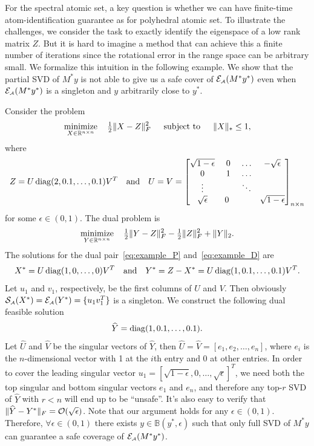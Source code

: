 For the spectral atomic set, a key question is whether we can have finite-time atom-identification guarantee as for polyhedral atomic set. To illustrate the challenges, we consider the task to exactly identify the eigenspace of a low rank matrix $Z$. But it is hard to imagine a method that can achieve this a finite number of iterations since the rotational error in the range space can be arbitrary small. We formalize this intuition in the following 
example. We show that the partial SVD of $M^*y$ is not able to give us a safe cover of $\mathcal{E}_{\scriptscriptstyle\mathcal{A}}(M^* y^*)$ even when $\mathcal{E}_{\scriptscriptstyle\mathcal{A}}(M^* y^*)$ is a singleton and $y$ arbitrarily close to $y^*$. 

\begin{example}\label{ex:partial-svd}
	Consider the problem
\begin{align}
  \displaystyle\mathop{\hbox{\rm minimize}}_{ X \in \mathbb{R}^{n \times n} }\enspace\enspace {\textstyle{\frac{1}{2}}} \| X - Z \|_F^2 \enspace\hbox{\quad subject to\quad}\enspace \| X \|_* \leq 1, \label{eq:example_P}
\end{align} 
where 
\[
  Z = U \operatorname{diag}( 2, 0.1, \ldots, 0.1 ) V^T \hbox{\quad and\quad} U = V = \begin{bmatrix}
    \sqrt{1 - \epsilon} &~ 0 &  ~\ldots  & -\sqrt{ \epsilon } \\
    0 & ~1  &  ~\ldots &  \\
    \vdots &  &~\ddots & \\
    \sqrt{ \epsilon } & 0 & & \sqrt{1 - \epsilon}
    \end{bmatrix}_{n \times n}
\]
for some $\epsilon \in (0,1)$. The dual problem is
\begin{align}
  \displaystyle\mathop{\hbox{\rm minimize}}_{ Y \in \mathbb{R}^{n \times n} }\enspace\enspace {\textstyle{\frac{1}{2}}} \| Y - Z \|_F^2 - {\textstyle{\frac{1}{2}}} \| Z \|_F^2 + \|Y\|_2. \label{eq:example_D}
\end{align} 
The solutions for the dual pair~\eqref{eq:example_P} and~\eqref{eq:example_D} are
\[
  X^* =  U \operatorname{diag}( 1, 0, \ldots, 0 ) V^T \hbox{\quad and\quad} Y^* = Z - X^* = U \operatorname{diag}( 1, 0.1, \ldots, 0.1 ) V^T.
\]
Let $u_1$ and $v_1$, respectively, be the first columns of $U$ and $V$. Then obviously $\operatorname{\mathcal{S}_{\scriptscriptstyle\mathcal{A}}}(X^*) = \mathcal{E}_{\scriptscriptstyle\mathcal{A}}(Y^*) = \{u_1 v_1^T\}$ is a singleton. We construct the following dual feasible solution
\[
  \widehat{Y} = \operatorname{diag}(1, 0.1, \ldots, 0.1).
\]
Let $\widehat{U}$ and $\widehat{V}$ be the singular vectors of $\widehat{Y}$, then $\widehat{U} = \widehat{V} = [e_1, e_2, \ldots, e_n]$, where $e_i$ is the $n$-dimensional vector with 1 at the $i$th entry and 0 at other entries. In order to cover the leading singular vector $u_1 = [\sqrt{1 - \epsilon}, 0, \ldots, \sqrt{\epsilon}]^T$, we need both the top singular and bottom singular vectors $e_1$ and $e_n$, and therefore any top-$r$ SVD of $\widehat{Y}$ with $r < n$  will end up to be ``unsafe''. It's also easy to verify that $\| \widehat{Y} - Y^* \|_F = \mathcal{O}( \sqrt{\epsilon} ) $. Note that our argument holds for any $\epsilon \in (0, 1)$. Therefore, $\forall \epsilon \in (0, 1)$ there exists $y \in \mathbb{B}(y^*, \epsilon)$ such that only full SVD of $M^*y$ can guarantee a safe coverage of $\mathcal{E}_{\scriptscriptstyle\mathcal{A}}(M^*y^*)$. 
\end{example}

